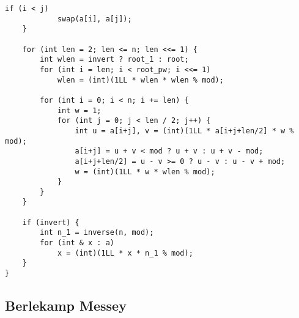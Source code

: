 \documentclass[10pt]{article}
\begin{document}
\begin{multicols*}{2}
\begin{lstlisting}[style=compactcpp]
        if (i < j)
            swap(a[i], a[j]);
    }

    for (int len = 2; len <= n; len <<= 1) {
        int wlen = invert ? root_1 : root;
        for (int i = len; i < root_pw; i <<= 1)
            wlen = (int)(1LL * wlen * wlen % mod);

        for (int i = 0; i < n; i += len) {
            int w = 1;
            for (int j = 0; j < len / 2; j++) {
                int u = a[i+j], v = (int)(1LL * a[i+j+len/2] * w % mod);
                a[i+j] = u + v < mod ? u + v : u + v - mod;
                a[i+j+len/2] = u - v >= 0 ? u - v : u - v + mod;
                w = (int)(1LL * w * wlen % mod);
            }
        }
    }

    if (invert) {
        int n_1 = inverse(n, mod);
        for (int & x : a)
            x = (int)(1LL * x * n_1 % mod);
    }
}
\end{lstlisting}

\subsection{Berlekamp Messey}


\end{multicols*}
\end{document}
